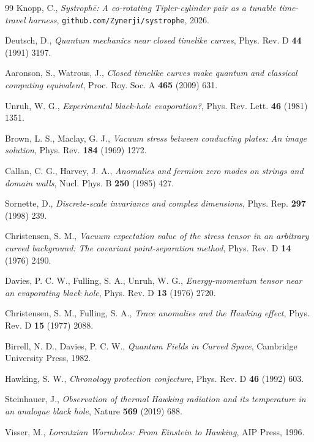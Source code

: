 \documentclass[11pt,a4paper]{article}
\begin{document}
\begin{thebibliography}{99}
Knopp, C., \textit{Systroph\=e: A co-rotating Tipler-cylinder pair as a
tunable time-travel harness},
\texttt{github.com/Zynerji/systrophe}, 2026.

Deutsch, D., \textit{Quantum mechanics near closed timelike curves},
Phys. Rev. D \textbf{44} (1991) 3197.

Aaronson, S., Watrous, J., \textit{Closed timelike curves make
quantum and classical computing equivalent},
Proc. Roy. Soc. A \textbf{465} (2009) 631.

Unruh, W. G., \textit{Experimental black-hole evaporation?},
Phys. Rev. Lett. \textbf{46} (1981) 1351.

Brown, L. S., Maclay, G. J.,
\textit{Vacuum stress between conducting plates: An image solution},
Phys. Rev. \textbf{184} (1969) 1272.

Callan, C. G., Harvey, J. A., \textit{Anomalies and fermion zero modes
on strings and domain walls},
Nucl. Phys. B \textbf{250} (1985) 427.

Sornette, D., \textit{Discrete-scale invariance and complex dimensions},
Phys. Rep. \textbf{297} (1998) 239.

Christensen, S. M., \textit{Vacuum expectation value of the stress
tensor in an arbitrary curved background: The covariant point-separation
method}, Phys. Rev. D \textbf{14} (1976) 2490.

Davies, P. C. W., Fulling, S. A., Unruh, W. G.,
\textit{Energy-momentum tensor near an evaporating black hole},
Phys. Rev. D \textbf{13} (1976) 2720.

Christensen, S. M., Fulling, S. A., \textit{Trace anomalies and the
Hawking effect}, Phys. Rev. D \textbf{15} (1977) 2088.

Birrell, N. D., Davies, P. C. W., \textit{Quantum Fields in Curved
Space}, Cambridge University Press, 1982.

Hawking, S. W., \textit{Chronology protection conjecture}, Phys.
Rev. D \textbf{46} (1992) 603.

Steinhauer, J., \textit{Observation of thermal Hawking radiation and
its temperature in an analogue black hole}, Nature \textbf{569} (2019)
688.

Visser, M., \textit{Lorentzian Wormholes: From Einstein to Hawking},
AIP Press, 1996.

\end{thebibliography}
\end{document}
